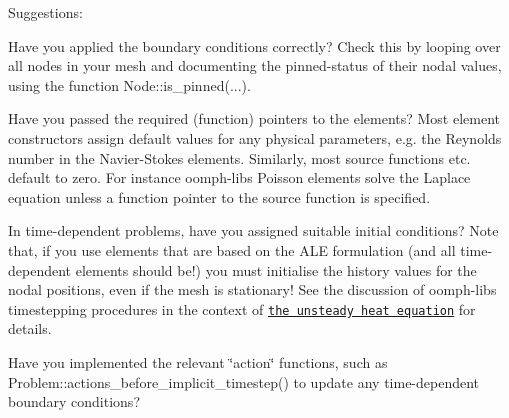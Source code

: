 Suggestions\+:
\begin{DoxyItemize}
\item Have you applied the boundary conditions correctly? Check this by looping over all nodes in your mesh and documenting the pinned-\/status of their nodal values, using the function {\ttfamily Node\+::is\+\_\+pinned}(...). ~\newline
~\newline

\item Have you passed the required (function) pointers to the elements? Most element constructors assign default values for any physical parameters, e.\+g. the Reynolds number in the Navier-\/\+Stokes elements. Similarly, most source functions etc. default to zero. For instance {\ttfamily oomph-\/lib\textquotesingle{}s} Poisson elements solve the Laplace equation unless a function pointer to the source function is specified. ~\newline
~\newline

\item In time-\/dependent problems, have you assigned suitable initial conditions? Note that, if you use elements that are based on the A\+LE formulation (and all time-\/dependent elements should be!) you must initialise the history values for the nodal positions, even if the mesh is stationary! See the discussion of {\ttfamily oomph-\/lib\textquotesingle{}s} timestepping procedures in the context of \href{../../unsteady_heat/two_d_unsteady_heat/html/index.html}{\tt the unsteady heat equation} for details. ~\newline
~\newline

\item Have you implemented the relevant \char`\"{}action\char`\"{} functions, such as {\ttfamily Problem\+::actions\+\_\+before\+\_\+implicit\+\_\+timestep()} to update any time-\/dependent boundary conditions?
\end{DoxyItemize}

